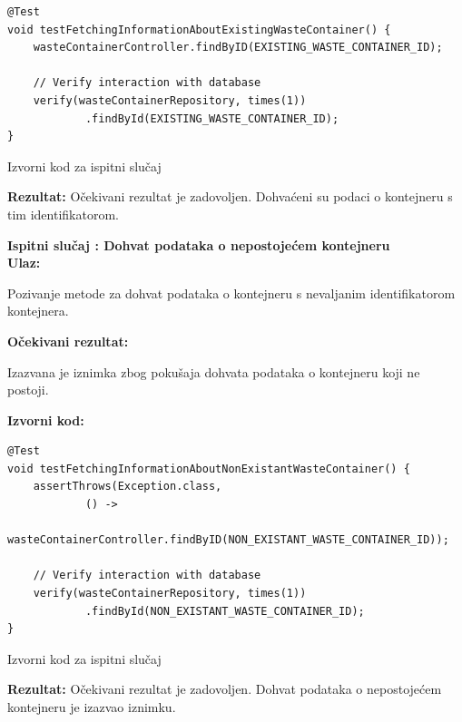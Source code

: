 			\begin{listing}[H]
\begin{verbatim}
@Test
void testFetchingInformationAboutExistingWasteContainer() {
    wasteContainerController.findByID(EXISTING_WASTE_CONTAINER_ID);

    // Verify interaction with database
    verify(wasteContainerRepository, times(1))
            .findById(EXISTING_WASTE_CONTAINER_ID);
}
\end{verbatim}
				\caption{Izvorni kod za ispitni slučaj \thetestcase}
				\label{test2}
			\end{listing}
			\noindent \textbf{Rezultat:} Očekivani rezultat je zadovoljen. Dohvaćeni su podaci o kontejneru s tim identifikatorom.
			\clearpage
			
			\noindent \textbf{Ispitni slučaj \thetestcase: Dohvat podataka o nepostojećem kontejneru} \\
			\noindent \textbf{Ulaz:}
			\begin{packed_enum}
				\item Pozivanje metode za dohvat podataka o kontejneru s nevaljanim identifikatorom kontejnera.
			\end{packed_enum}
			\noindent \textbf{Očekivani rezultat:}
			\begin{packed_enum}
				\item[1.a] Izazvana je iznimka zbog pokušaja dohvata podataka o kontejneru koji ne postoji.
			\end{packed_enum}
			\noindent \textbf{Izvorni kod:}

			\begin{listing}[H]
\begin{verbatim}
@Test
void testFetchingInformationAboutNonExistantWasteContainer() {
    assertThrows(Exception.class,
            () -> 
	       wasteContainerController.findByID(NON_EXISTANT_WASTE_CONTAINER_ID));

    // Verify interaction with database
    verify(wasteContainerRepository, times(1))
            .findById(NON_EXISTANT_WASTE_CONTAINER_ID);
}
\end{verbatim}
				\caption{Izvorni kod za ispitni slučaj \thetestcase}
				\label{test3}
			\end{listing}
			\noindent \textbf{Rezultat:} Očekivani rezultat je zadovoljen. Dohvat podataka o nepostojećem kontejneru je izazvao iznimku.

